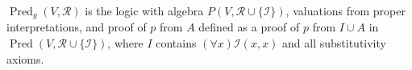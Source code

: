 $\operatorname{Pred}_g(V, \mathcal{R})$ is the logic with algebra $P(V, \mathcal{R} \cup \{\mathcal{I}\})$, valuations from proper interpretations, and proof of $p$ from $A$ defined as a proof of $p$ from $I \cup A$ in $\operatorname{Pred}(V, \mathcal{R} \cup \{\mathcal{I}\})$, where $I$ contains $(\forall x)\mathcal{I}(x,x)$ and all substitutivity axioms.
